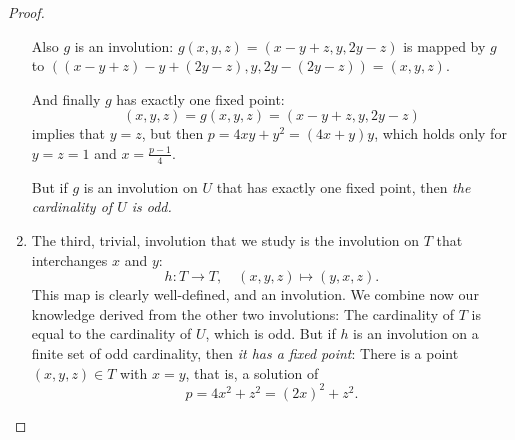 \begin{proof}
\begin{enumerate}
    Also $g$ is an involution: $g(x, y, z) = (x - y + z, y, 2y - z)$ is mapped by $g$ to
    $((x - y + z) - y + (2y - z), y, 2y - (2y - z)) = (x, y, z)$.

    And finally $g$ has exactly one fixed point:
    \[
    (x, y, z) = g(x, y, z) = (x - y + z, y, 2y - z)
    \]
    implies that $y = z$, but then $p = 4xy + y^2 = (4x + y)y$, which holds only for $y = z = 1$ and
    $x = \frac{p - 1}{4}$.

    But if $g$ is an involution on $U$ that has exactly one fixed point, then
    \emph{the cardinality of $U$ is odd.}

    \item The third, trivial, involution that we study is the involution on $T$ that interchanges
    $x$ and $y$:
    \[
    h : T \to T, \quad (x, y, z) \mapsto (y, x, z).
    \]
    This map is clearly well-defined, and an involution. We combine now our knowledge derived from
    the other two involutions: The cardinality of $T$ is equal to the cardinality of $U$, which is
    odd. But if $h$ is an involution on a finite set of odd cardinality, then
    \emph{it has a fixed point}: There is a point $(x, y, z) \in T$ with $x = y$, that is,
    a solution of
    \[
    p = 4x^2 + z^2 = (2x)^2 + z^2.
    \]
\end{enumerate}

\end{proof}

